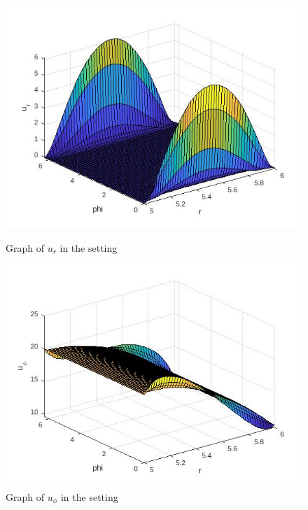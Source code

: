 \documentclass[12pt,a4paper]{report}
\begin{document}
\begin{figure}[H]
\centering
\begin{minipage}{.5\textwidth}
  \centering
  \includegraphics[width=1.2\linewidth]{UrFcircle.jpg} 
  \caption{Graph of \(u_r\) in the setting}
  \label{fig:plot1}
\end{minipage}%
\begin{minipage}{.5\textwidth}
  \centering
  \includegraphics[width=1.2\linewidth]{UphiFcircle.jpg}
  \caption{Graph of \(u_{\phi}\) in the setting}
  \label{fig:plot2}
\end{minipage}
\end{figure}
\end{document}
